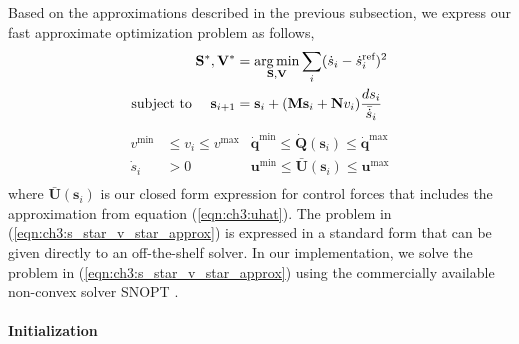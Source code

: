 Based on the approximations described in the previous subsection, we express our fast approximate optimization problem as follows, 
%
\begin{equation*}
\begin{aligned}
\mathbf{S}^{*},\mathbf{V}^{*} & = \operatorname*{arg\,min}_{\mathbf{S},\mathbf{V}} \sum_{i} ( \dot{s}_i - \dot{s}_i^{\text{ref}} )^{2} \\
\text{subject to~~~~}
\mathbf{s}_{i+1}              & =    \mathbf{s}_{i} + (\mathbf{M}\mathbf{s}_{i} + \mathbf{N}v_{i}) \frac{ds_i}{\bar{\dot{s}}_i} \\
\end{aligned}
\end{equation*}
%
\begin{equation}
\begin{aligned}
v^{\text{min}}  & \leq v_i \leq v^{\text{max}} & \dot{\mathbf{q}}^{\text{min}} \leq \dot{\mathbf{Q}}(\mathbf{s}_i) \leq \dot{\mathbf{q}}^{\text{max}} \\
\dot{s}_i       & > 0                                   & \mathbf{u}^{\text{min}}       \leq \bar{\mathbf{U}}(\mathbf{s}_i)       \leq \mathbf{u}^{\text{max}} \\
\end{aligned}
\label{eqn:ch3:s_star_v_star_approx}
\end{equation}
%
where $\bar{\mathbf{U}}(\mathbf{s}_i)$ is our closed form expression for control forces that includes the approximation from equation (\ref{eqn:ch3:uhat}).
The problem in (\ref{eqn:ch3:s_star_v_star_approx}) is expressed in a standard form that can be given directly to an off-the-shelf solver.
In our implementation, we solve the problem in (\ref{eqn:ch3:s_star_v_star_approx}) using the commercially available non-convex solver SNOPT \cite{gill:2002}.


\paragraph{Initialization}

